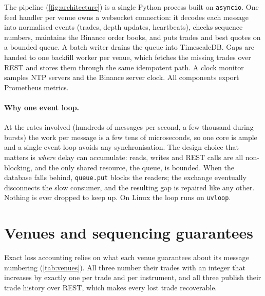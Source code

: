 \documentclass[11pt,a4paper]{article}
\newcommand{\code}[1]{\texttt{#1}}
\begin{document}
The pipeline (\cref{fig:architecture}) is a single Python process built on \code{asyncio}. One feed handler per
venue owns a websocket connection: it decodes each message into normalised events (trades, depth updates,
heartbeats), checks sequence numbers, maintains the Binance order books, and puts trades and best quotes on a
bounded queue. A batch writer drains the queue into TimescaleDB. Gaps are handed to one backfill worker per
venue, which fetches the missing trades over REST and stores them through the same idempotent path. A clock
monitor samples NTP servers and the Binance server clock. All components export Prometheus metrics.

\paragraph{Why one event loop.} At the rates involved (hundreds of messages per second, a few thousand during
bursts) the work per message is a few tens of microseconds, so one core is ample and a single event loop avoids
any synchronisation. The design choice that matters is \emph{where} delay can accumulate: reads, writes and REST
calls are all non-blocking, and the only shared resource, the queue, is bounded. When the database falls behind,
\code{queue.put} blocks the readers; the exchange eventually disconnects the slow consumer, and the resulting gap
is repaired like any other. Nothing is ever dropped to keep up. On Linux the loop runs on \code{uvloop}.

\section{Venues and sequencing guarantees}\label{sec:venues}

Exact loss accounting relies on what each venue guarantees about its message numbering
(\cref{tab:venues}). All three number their trades with an integer that increases by exactly one per trade and
per instrument, and all three publish their trade history over REST, which makes every lost trade recoverable.
\end{document}

